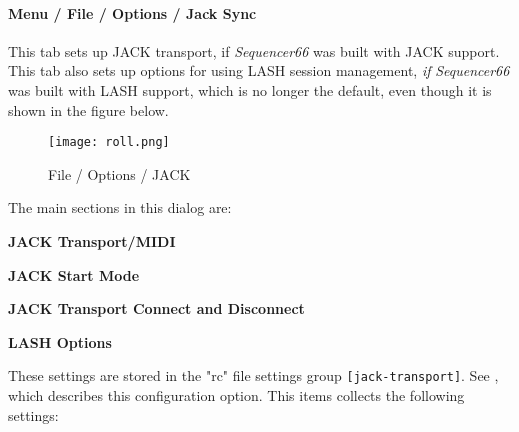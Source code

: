 \paragraph{Menu / File / Options / Jack Sync}
\label{paragraph:seq66_menu_file_options_jack_sync}

   This tab sets up JACK transport, if \textsl{Sequencer66}
   was built with JACK support.
   This tab also sets up options for using LASH session management, \textsl{if}
   \textsl{Sequencer66} was built with LASH support, which is no longer the
   default, even though it is shown in the figure below.

\begin{figure}[H]
   \centering 
   \texttt{[image: roll.png]}
   \caption{File / Options / JACK}
   \label{fig:seq66_menu_file_options_jack_sync}
\end{figure}

   The main sections in this dialog are:

   \begin{enumber}
      \item \textbf{JACK Transport/MIDI}
      \item \textbf{JACK Start Mode}
      \item \textbf{JACK Transport Connect and Disconnect}
      \item \textbf{LASH Options}
   \end{enumber}

   \setcounter{ItemCounter}{0}      %

   These settings are stored in the "rc" file settings group
   \texttt{[jack-transport]}.
   See ,
   which describes this configuration option.
   This items collects the following settings:

